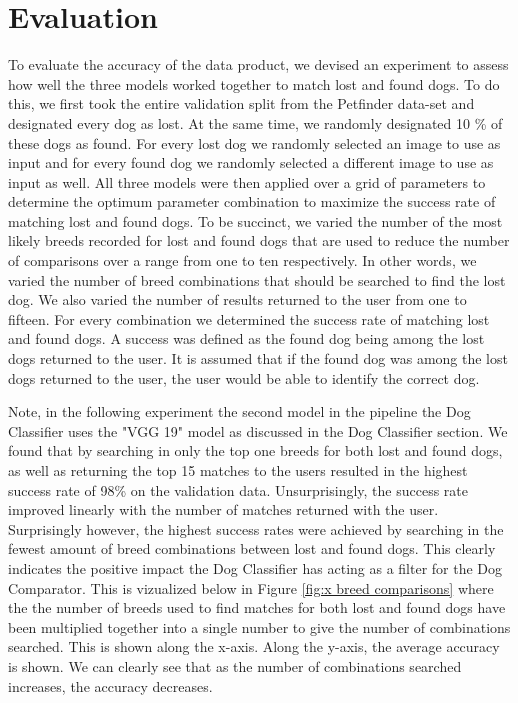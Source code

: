 \documentclass{article}
\begin{document}
\section{Evaluation}
To evaluate the accuracy of the data product, we devised an experiment to assess how well the three models worked together to match lost and found dogs.  To do this, we first took the entire validation split from the Petfinder data-set and designated every dog as lost.  At the same time, we randomly designated 10 \% of these dogs as found.  For every lost dog we randomly selected an image to use as input and for every found dog we randomly selected a different image to use as input as well.   All three models were then applied over a grid of parameters to determine the optimum parameter combination to maximize the success rate of matching lost and found dogs.  To be succinct, we varied the number of the most likely breeds recorded for lost and found dogs that are used to reduce the number of comparisons over a range from one to ten respectively.  In other words, we varied the number of breed combinations that should be searched to find the lost dog.  We also varied the number of results returned to the user from one to fifteen.  For every combination we determined the success rate of matching lost and found dogs.  A success was defined as the found dog being among the lost dogs returned to the user.  It is assumed that if the found dog was among the lost dogs returned to the user, the user would be able to identify the correct dog. 

Note, in the following experiment the second model in the pipeline the Dog Classifier uses the "VGG 19" model as discussed in the Dog Classifier section.  We found that by searching in only the top one breeds for both lost and found dogs, as well as returning the top 15 matches to the users resulted in the highest success rate of 98\% on the validation data.  Unsurprisingly, the success rate improved linearly with the number of matches returned with the user.  Surprisingly however, the highest success rates were achieved by searching in the fewest amount of breed combinations between lost and found dogs.  This clearly indicates the positive impact the Dog Classifier has acting as a filter for the Dog Comparator.  This is vizualized below in Figure \ref{fig:x breed comparisons} where the the number of breeds used to find matches for both lost and found dogs have been multiplied together into a single number to give the number of combinations searched.  This is shown along the x-axis.  Along the y-axis, the average accuracy is shown.  We can clearly see that as the number of combinations searched increases, the accuracy decreases.
\end{document}
